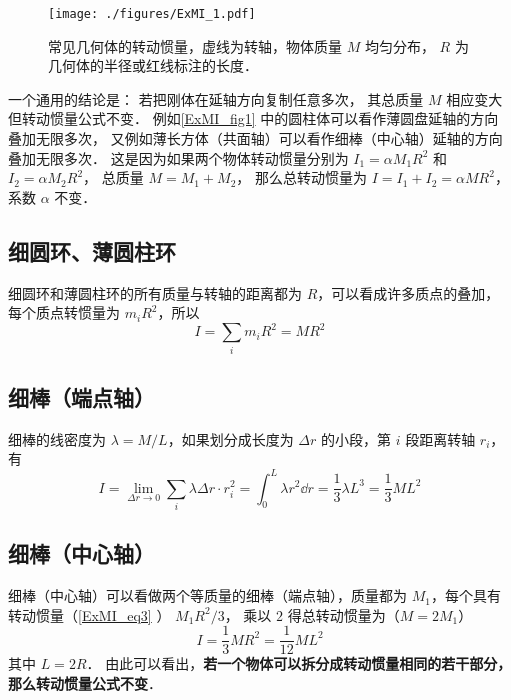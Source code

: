 

\begin{figure}[ht]
\centering
\texttt{[image: ./figures/ExMI\_1.pdf]}
\caption{常见几何体的转动惯量，虚线为转轴，物体质量 $M$ 均匀分布， $R$ 为几何体的半径或红线标注的长度．}\label{ExMI_fig1}
\end{figure}

一个通用的结论是： 若把刚体在延轴方向复制任意多次， 其总质量 $M$ 相应变大但转动惯量公式不变． 例如\autoref{ExMI_fig1} 中的圆柱体可以看作薄圆盘延轴的方向叠加无限多次， 又例如薄长方体（共面轴）可以看作细棒（中心轴）延轴的方向叠加无限多次． 这是因为如果两个物体转动惯量分别为 $I_1 = \alpha M_1 R^2$ 和 $I_2 = \alpha M_2 R^2$， 总质量 $M = M_1 + M_2$， 那么总转动惯量为 $I = I_1 + I_2 = \alpha M R^2$， 系数 $\alpha$ 不变．

\subsection{细圆环、薄圆柱环}
细圆环和薄圆柱环的所有质量与转轴的距离都为 $R$，可以看成许多质点的叠加，每个质点转惯量为 $m_i R^2$，所以
\begin{equation}\label{ExMI_eq4}
I = \sum_i m_i R^2 = M R^2
\end{equation}

\subsection{ 细棒（端点轴）}
细棒的线密度为 $\lambda  = M/L$，如果划分成长度为 $\Delta r$ 的小段，第 $i$ 段距离转轴 $r_i$， 有
\begin{equation}\label{ExMI_eq3}
I = \lim_{\Delta r \to 0}\sum_i \lambda\Delta r \cdot r_i^2 =  \int_0^L \lambda r^2 \dd{r} = \frac{1}{3}\lambda L^3 = \frac{1}{3}M L^2
\end{equation}

\subsection{细棒（中心轴）}
细棒（中心轴）可以看做两个等质量的细棒（端点轴），质量都为 $M_1$，每个具有转动惯量（\autoref{ExMI_eq3} ） $M_1 R^2/3$， 乘以 $2$ 得总转动惯量为（$M=2M_1$）
\begin{equation}\label{ExMI_eq2}
I = \frac{1}{3} MR^2 = \frac{1}{12}ML^2
\end{equation}
其中 $L=2R$． 由此可以看出，\textbf{若一个物体可以拆分成转动惯量相同的若干部分，那么转动惯量公式不变}．


